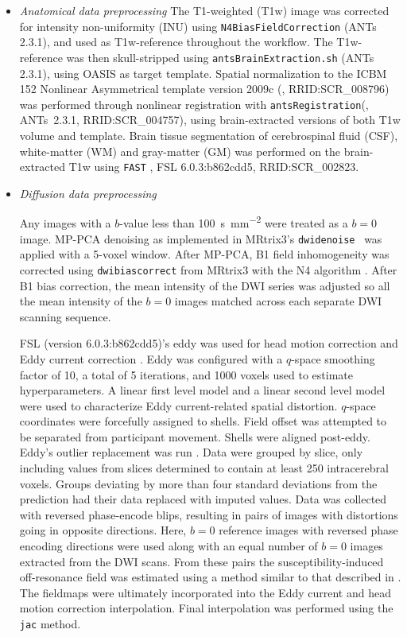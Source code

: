 \documentclass[fleqn,10pt,inline]{wlscirep}
\begin{document}
\begin{itemize}

\item {\it Anatomical data preprocessing}
The T1-weighted (T1w) image was corrected for intensity non-uniformity (INU)
using \texttt{N4BiasFieldCorrection} \cite{n4} (ANTs 2.3.1), and used as
T1w-reference throughout the workflow. The T1w-reference was then skull-stripped
using \texttt{antsBrainExtraction.sh} (ANTs 2.3.1), using OASIS as target
template. Spatial normalization to the ICBM 152 Nonlinear Asymmetrical template
version 2009c (\cite{mni}, RRID:SCR\_008796) was performed through nonlinear
registration with \texttt{antsRegistration}\linebreak(\cite{ants}, ANTs~2.3.1,
RRID:SCR\_004757), using brain-extracted versions of both T1w volume and
template. Brain tissue segmentation of cerebrospinal fluid (CSF), white-matter
(WM) and gray-matter (GM) was performed on the brain-extracted T1w using
\texttt{FAST} \cite{fsl-fast}, FSL 6.0.3:b862cdd5, RRID:SCR\_002823.

\item {\it Diffusion data preprocessing}

Any images with a $b$-value less than \qty{100}{\second \per \mm^{2}} were treated
as a $b=0$ image. MP-PCA denoising as implemented in MRtrix3's \texttt{dwidenoise}~\cite{dwidenoise1} was applied with a 5-voxel window. After
MP-PCA, B1 field inhomogeneity was corrected using \texttt{dwibiascorrect} from
MRtrix3 with the N4 algorithm \cite{n4}. After B1 bias correction, the mean
intensity of the DWI series was adjusted so all the mean intensity of the $b=0$
images matched across each separate DWI scanning sequence.

FSL (version 6.0.3:b862cdd5)'s eddy was used for head motion correction
and Eddy current correction \cite{anderssoneddy}. Eddy was configured
with a \(q\)-space smoothing factor of 10, a total of 5 iterations, and
\num{1000} voxels used to estimate hyperparameters. A linear first level model
and a linear second level model were used to characterize Eddy
current-related spatial distortion. \(q\)-space coordinates were
forcefully assigned to shells. Field offset was attempted to be
separated from participant movement. Shells were aligned post-eddy. Eddy's
outlier replacement was run \cite{eddyrepol}. Data were grouped by
slice, only including values from slices determined to contain at least
\num{250} intracerebral voxels. Groups deviating by more than four standard
deviations from the prediction had their data replaced with imputed
values. Data was collected with reversed phase-encode blips, resulting
in pairs of images with distortions going in opposite directions. Here,
$b=0$ reference images with reversed phase encoding directions were used
along with an equal number of $b=0$ images extracted from the DWI scans.
From these pairs the susceptibility-induced off-resonance field was
estimated using a method similar to that described in \cite{topup}. The
fieldmaps were ultimately incorporated into the Eddy current and head
motion correction interpolation. Final interpolation was performed using
the \texttt{jac} method.


\end{itemize}
\end{document}
